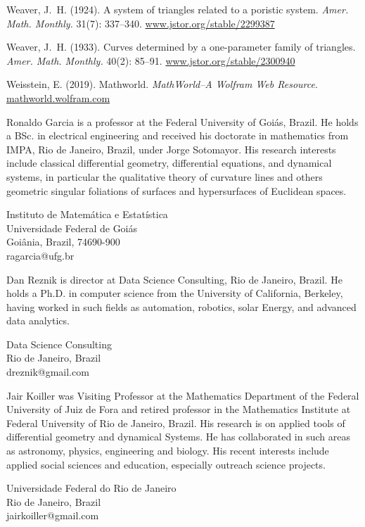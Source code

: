 \documentclass{article}
\theoremstyle{definition}
\begin{document}
\begin{thebibliography}{10}
Weaver, J.~H. (1924).
\newblock A system of triangles related to a poristic system.
\newblock \emph{Amer. Math. Monthly.} 31(7): 337--340.
\newblock \url{www.jstor.org/stable/2299387}

Weaver, J.~H. (1933).
\newblock Curves determined by a one-parameter family of triangles.
\newblock \emph{Amer. Math. Monthly.} 40(2): 85--91.
\newblock \url{www.jstor.org/stable/2300940}

Weisstein, E. (2019).
\newblock Mathworld.
\newblock \emph{MathWorld--A Wolfram Web Resource}.
\newblock \url{mathworld.wolfram.com}

\end{thebibliography}

\begin{biog}

\item[Ronaldo Garcia] is a professor at the Federal University of Goiás, Brazil. He holds a BSc. in electrical engineering and received his doctorate in mathematics from IMPA, Rio de Janeiro, Brazil, under Jorge Sotomayor. His research interests include classical differential geometry, differential equations, and dynamical systems, in particular the qualitative theory of curvature lines and others geometric singular foliations of surfaces and hypersurfaces of Euclidean spaces.
\begin{affil}
Instituto de Matemática e Estatística\\
Universidade Federal de Goiás\\
Goiânia, Brazil, 74690-900\\
{ragarcia@ufg.br}
\end{affil}

\item[Dan Reznik] is director at Data Science Consulting, Rio de Janeiro, Brazil. He holds a Ph.D. in computer science from the University of California, Berkeley, having worked in such fields as automation, robotics, solar Energy, and advanced data analytics.
\begin{affil}
Data Science Consulting\\
Rio de Janeiro, Brazil\\
{dreznik@gmail.com}
\end{affil}

\item[Jair Koiller] was Visiting Professor at the Mathematics Department of the Federal University of Juiz de Fora and retired professor in the Mathematics Institute at Federal University of Rio de Janeiro, Brazil. His research is on applied tools of differential geometry and dynamical Systems. He has collaborated in such areas as astronomy, physics, engineering and biology. His recent interests include applied social sciences and education, especially outreach science projects.

\begin{affil}
Universidade Federal do Rio de Janeiro\\
Rio de Janeiro, Brazil\\
{jairkoiller@gmail.com}
\end{affil}
\end{biog}
\end{document}
